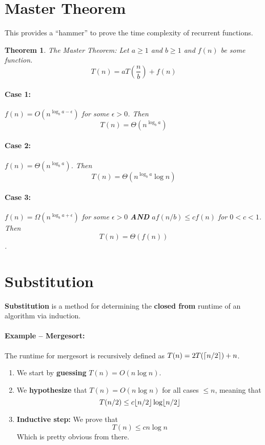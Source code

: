 \documentclass[a4paper,12pt]{report}
\newtheorem{theorem}{Theorem}
\DeclarePairedDelimiter{\ceil}{\lceil}{\rceil}
\DeclarePairedDelimiter{\floor}{\lfloor}{\rfloor}
\begin{document}
\section{Master Theorem}

This provides a ``hammer'' to prove the time complexity of recurrent functions.
\begin{theorem}{The Master Theorem:}
Let $a \geq 1$ and $b \geq 1$ and $f(n)$ be some function.
\begin{equation}
T(n) = aT(\frac{n}{b}) + f(n)
\end{equation}

\paragraph{Case 1: } $f(n) = O(n^{\log_b a - \epsilon})$ for some $\epsilon > 0$. Then $$T(n) = \Theta(n^{\log_b a})$$

\paragraph{Case 2: } $f(n) = \Theta(n^{\log_b a})$. Then $$T(n) = \Theta(n^{\log_b a} \log n)$$

\paragraph{Case 3: } $f(n) = \Omega(n^{\log_b a + \epsilon})$ for some $\epsilon > 0$ \textbf{AND} $af(n/b) \leq c f(n)$ for $0 < c < 1$. Then $$T(n) = \Theta(f(n))$$.
\end{theorem}








\section{Substitution}

\textbf{Substitution} is a method for determining the \textbf{closed from} runtime of an algorithm via induction.

\paragraph{Example -- Mergesort: } The runtime for mergesort is recursively defined as $T(n) = 2T(\ceil{n/2}) + n$.
\begin{enumerate}
\item We start by \textbf{guessing} $T(n) = O(n\log n)$. 
\item We \textbf{hypothesize} that $T(n) = O(n\log n)$ for all cases $\leq n$, meaning that
$$T(n/2) \leq c \floor{n/2}\log \floor{n/2}$$
\item \textbf{Inductive step:} We prove that $$T(n) \leq cn\log n$$ Which is pretty obvious from there. 
\end{enumerate}
\end{document}
